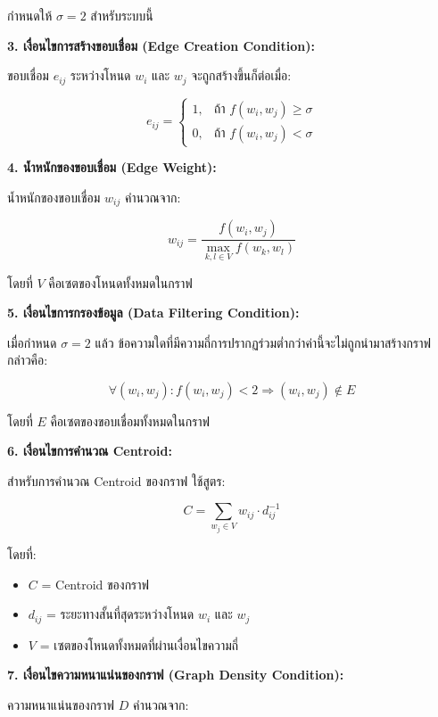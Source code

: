 \documentclass[12pt,a4paper]{article}
\begin{document}
\begin{enumerate}[leftmargin=2cm]
\begin{enumerate}
{\begin{enumerate}
            กำหนดให้ $\sigma = 2$ สำหรับระบบนี้

            \vspace{6cm}

            \textbf{3. เงื่อนไขการสร้างขอบเชื่อม (Edge Creation Condition):}

            ขอบเชื่อม $e_{ij}$ ระหว่างโหนด $w_i$ และ $w_j$ จะถูกสร้างขึ้นก็ต่อเมื่อ:

            $$e_{ij} = \begin{cases} 
            1, & \text{ถ้า } f(w_i, w_j) \geq \sigma \\
            0, & \text{ถ้า } f(w_i, w_j) < \sigma 
            \end{cases}$$

            \textbf{4. น้ำหนักของขอบเชื่อม (Edge Weight):}

            น้ำหนักของขอบเชื่อม $w_{ij}$ คำนวณจาก:

            $$w_{ij} = \frac{f(w_i, w_j)}{\max_{k,l \in V} f(w_k, w_l)}$$

            โดยที่ $V$ คือเซตของโหนดทั้งหมดในกราฟ

            \textbf{5. เงื่อนไขการกรองข้อมูล (Data Filtering Condition):}

            เมื่อกำหนด $\sigma = 2$ แล้ว ข้อความใดที่มีความถี่การปรากฏร่วมต่ำกว่าค่านี้จะไม่ถูกนำมาสร้างกราฟ กล่าวคือ:

            $$\forall (w_i, w_j) : f(w_i, w_j) < 2 \Rightarrow (w_i, w_j) \notin E$$

            โดยที่ $E$ คือเซตของขอบเชื่อมทั้งหมดในกราฟ

            \textbf{6. เงื่อนไขการคำนวณ Centroid:}

            สำหรับการคำนวณ Centroid ของกราฟ ใช้สูตร:

            $$C = \sum_{w_j \in V} w_{ij} \cdot d_{ij}^{-1}$$

            โดยที่:
            \begin{itemize}
                \item $C$ = Centroid ของกราฟ
                \item $d_{ij}$ = ระยะทางสั้นที่สุดระหว่างโหนด $w_i$ และ $w_j$
                \item $V$ = เซตของโหนดทั้งหมดที่ผ่านเงื่อนไขความถี่
            \end{itemize}

            \textbf{7. เงื่อนไขความหนาแน่นของกราฟ (Graph Density Condition):}

            ความหนาแน่นของกราฟ $D$ คำนวณจาก:


\end{enumerate}}
\end{enumerate}
\end{enumerate}
\end{document}
